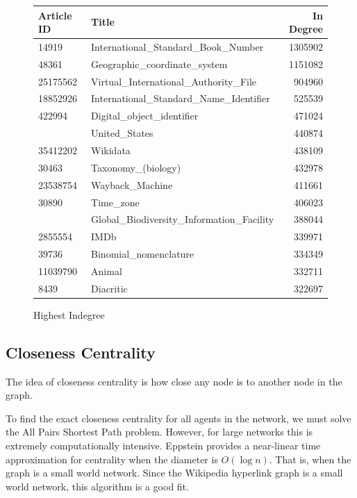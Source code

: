 \documentclass{article}
\begin{document}
\begin{figure}[H]
    \centering
    \caption{Highest Indegree}
    \begin{tabular}{llr}
        \toprule
        Article ID & Title & In Degree\\
        \midrule
        14919 & International\_Standard\_Book\_Number & 1305902\\
        48361 & Geographic\_coordinate\_system & 1151082\\
        25175562 & Virtual\_International\_Authority\_File & 904960\\
        18852926 & International\_Standard\_Name\_Identifier & 525539\\
        422994 & Digital\_object\_identifier & 471024\\
        \addlinespace
        3434750 & United\_States & 440874\\
        35412202 & Wikidata & 438109\\
        30463 & Taxonomy\_(biology) & 432978\\
        23538754 & Wayback\_Machine & 411661\\
        30890 & Time\_zone & 406023\\
        \addlinespace
        2987862 & Global\_Biodiversity\_Information\_Facility & 388044\\
        2855554 & IMDb & 339971\\
        39736 & Binomial\_nomenclature & 334349\\
        11039790 & Animal & 332711\\
        8439 & Diacritic & 322697\\
        \bottomrule
    \end{tabular}
\end{figure}
    


\subsection{Closeness Centrality}


The idea of closeness centrality is how close any node is to another node in the graph.

To find the exact closeness centrality for all agents in the network, we must solve the All Pairs Shortest Path problem. However, for large networks this is extremely computationally intensive. 
Eppstein provides a near-linear time approximation for centrality when the diameter is $O(\log n)$. That is, when the graph is a small world network. Since the Wikipedia hyperlink graph is a small world network, this algorithm is a good fit.
\end{document}
